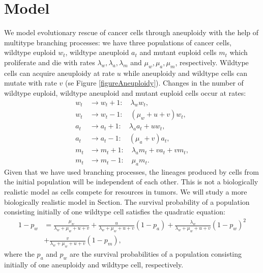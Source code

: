 \documentclass[11pt,a4paper]{article}
\begin{document}
\section{Model}
We model evolutionary rescue of cancer cells through aneuploidy with the help of multitype branching processes: we have three populations of cancer cells, wildtype euploid $w_t$, wildtype aneuploid $a_t$ and mutant euploid cells $m_t$ which proliferate and die with rates $\lambda_w,  \lambda_a,  \lambda_m$ and $\mu_w, \mu_a, \mu_m$, respectively. Wildtype cells can acquire aneuploidy at rate $u$ while aneuploidy and wildtype cells can mutate with rate $v$ (se Figure \ref{figureAneuploidy}). Changes in the number of wildtype euploid, wildtype aneuploid and mutant euploid cells occur at rates:
\begin{subequations}
\begin{flalign}
w_t&\rightarrow w_t+1:\quad \lambda_ww_t,\\
w_t&\rightarrow w_t-1:\quad \left(\mu_w+u+v\right)w_t,\\
a_t&\rightarrow a_t+1:\quad \lambda_aa_t+uw_t,\\
a_t&\rightarrow a_t-1:\quad \left(\mu_a+v\right)a_t,\\
m_t&\rightarrow m_t+1:\quad \lambda_am_t+va_t+vm_t,\\
m_t&\rightarrow m_t-1:\quad \mu_am_t.
\end{flalign}
\end{subequations}
Given that we have used branching processes, the lineages produced by cells from the initial population will be independent of each other. This is not a biologically realistic model as cells compete for resources in tumors. We will study a more biologically realistic model in Section.
The survival probability of a population consisting initially of one wildtype cell satisfies the quadratic equation:
\begin{align}\nonumber
1-p_w&=\frac{\mu_w}{\lambda_w+\mu_w+u+v}+\frac{u}{\lambda_w+\mu_w+u+v}\left(1-p_a\right)+\frac{\lambda_w}{\lambda_w+\mu_w+u+v}\left(1-p_w\right)^2\\ \label{quadraticeqev1}
&+\frac{v}{\lambda_w+\mu_w+u+v}\left(1-p_m\right),
\end{align}
where the $p_a$ and $p_w$ are the survival probabilities of a population consisting initially of one aneuploidy and wildtype cell, respectively.
\end{document}
